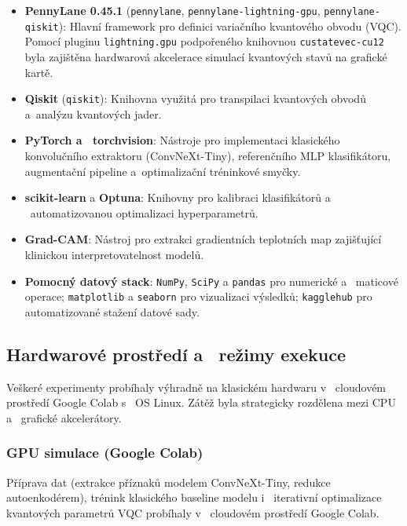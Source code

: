 \documentclass[12pt, a4paper]{report}
\begin{document}
\begin{itemize}
    \item \textbf{PennyLane 0.45.1} (\texttt{pennylane}, \texttt{pennylane-lightning-gpu}, \texttt{pennylane-qiskit}): Hlavní framework pro definici variačního kvantového obvodu (VQC). Pomocí pluginu \texttt{lightning.gpu} podpořeného knihovnou \texttt{custatevec-cu12} byla zajištěna hardwarová akcelerace simulací kvantových stavů na grafické kartě.
    \item \textbf{Qiskit} (\texttt{qiskit}): Knihovna využitá pro transpilaci kvantových obvodů a~analýzu kvantových jader.
    \item \textbf{PyTorch a ~torchvision}: Nástroje pro implementaci klasického konvolučního extraktoru (ConvNeXt-Tiny), referenčního MLP klasifikátoru, augmentační pipeline a~optimalizační tréninkové smyčky.
    \item \textbf{scikit-learn} a \textbf{Optuna}: Knihovny pro kalibraci klasifikátorů a ~automatizovanou optimalizaci hyperparametrů.
    \item \textbf{Grad-CAM}: Nástroj pro extrakci gradientních teplotních map zajišťující klinickou interpretovatelnost modelů.
    \item \textbf{Pomocný datový stack}: \texttt{NumPy}, \texttt{SciPy} a \texttt{pandas} pro numerické a ~maticové operace; \texttt{matplotlib} a \texttt{seaborn} pro vizualizaci výsledků; \texttt{kagglehub} pro automatizované stažení datové sady.
\end{itemize}

\subsection{Hardwarové prostředí a ~režimy exekuce}

Veškeré experimenty probíhaly výhradně na klasickém hardwaru v ~cloudovém prostředí Google Colab s ~OS Linux. Zátěž byla strategicky rozdělena mezi CPU a ~grafické akcelerátory.

\subsubsection*{GPU simulace (Google Colab)}
Příprava dat (extrakce příznaků modelem ConvNeXt-Tiny, redukce autoenkodérem), trénink klasického baseline modelu i ~iterativní optimalizace kvantových parametrů VQC probíhaly v ~cloudovém prostředí Google Colab.
\end{document}
